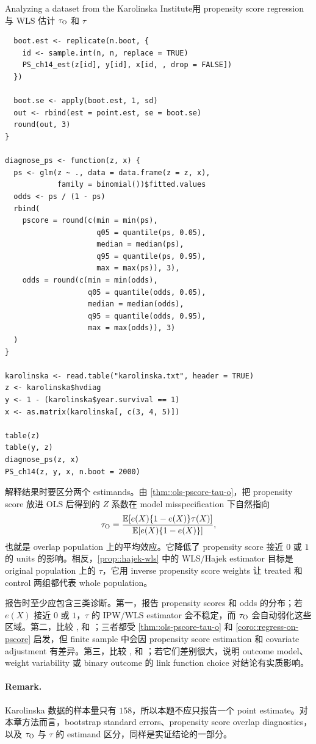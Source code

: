 \begin{exercisesolution}{Analyzing a dataset from the Karolinska Institute}{用 propensity score regression 与 WLS 估计 $\tau_\textsc{O}$ 和 $\tau$}
\begin{lstlisting}
  boot.est <- replicate(n.boot, {
    id <- sample.int(n, n, replace = TRUE)
    PS_ch14_est(z[id], y[id], x[id, , drop = FALSE])
  })

  boot.se <- apply(boot.est, 1, sd)
  out <- rbind(est = point.est, se = boot.se)
  round(out, 3)
}

diagnose_ps <- function(z, x) {
  ps <- glm(z ~ ., data = data.frame(z = z, x),
            family = binomial())$fitted.values
  odds <- ps / (1 - ps)
  rbind(
    pscore = round(c(min = min(ps),
                     q05 = quantile(ps, 0.05),
                     median = median(ps),
                     q95 = quantile(ps, 0.95),
                     max = max(ps)), 3),
    odds = round(c(min = min(odds),
                   q05 = quantile(odds, 0.05),
                   median = median(odds),
                   q95 = quantile(odds, 0.95),
                   max = max(odds)), 3)
  )
}

karolinska <- read.table("karolinska.txt", header = TRUE)
z <- karolinska$hvdiag
y <- 1 - (karolinska$year.survival == 1)
x <- as.matrix(karolinska[, c(3, 4, 5)])

table(z)
table(y, z)
diagnose_ps(z, x)
PS_ch14(z, y, x, n.boot = 2000)
\end{lstlisting}

解释结果时要区分两个 estimands。由 \cref{thm::ols-pscore-tau-o}，把 propensity score 放进 OLS 后得到的 $Z$ 系数在 model misspecification 下自然指向
\[
\tau_\textsc{O}
=\frac{\mathbb{E}[e(X)\{1-e(X)\}\tau(X)]}
       {\mathbb{E}[e(X)\{1-e(X)\}]},
\]
也就是 overlap population 上的平均效应。它降低了 propensity score 接近 $0$ 或 $1$ 的 units 的影响。相反，\cref{prop::hajek-wls} 中的 WLS/Hajek estimator 目标是 original population 上的 $\tau$，它用 inverse propensity score weights 让 treated 和 control 两组都代表 whole population。

报告时至少应包含三类诊断。第一，报告 propensity scores 和 odds 的分布；若 $e(X)$ 接近 $0$ 或 $1$，$\tau$ 的 IPW/WLS estimator 会不稳定，而 $\tau_\textsc{O}$ 会自动弱化这些区域。第二，比较 ,  和 ；三者都受 \cref{thm::ols-pscore-tau-o} 和 \cref{coro::regress-on-pscore} 启发，但 finite sample 中会因 propensity score estimation 和 covariate adjustment 有差异。第三，比较 ,  和 ；若它们差别很大，说明 outcome model、weight variability 或 binary outcome 的 link function choice 对结论有实质影响。

\paragraph{Remark.}
Karolinska 数据的样本量只有 $158$，所以本题不应只报告一个 point estimate。对本章方法而言，bootstrap standard errors、propensity score overlap diagnostics，以及 $\tau_\textsc{O}$ 与 $\tau$ 的 estimand 区分，同样是实证结论的一部分。
\end{exercisesolution}

